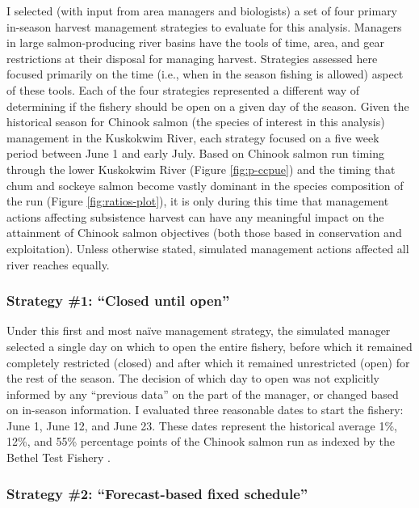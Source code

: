 \documentclass[12pt,]{book}
\theoremstyle{definition}
\theoremstyle{definition}
\theoremstyle{definition}
\theoremstyle{remark}
\begin{document}
\noindent
I selected (with input from area managers and biologists) a set of four
primary in-season harvest management strategies to evaluate for this
analysis. Managers in large salmon-producing river basins have the tools
of time, area, and gear restrictions at their disposal for managing
harvest. Strategies assessed here focused primarily on the time (i.e.,
when in the season fishing is allowed) aspect of these tools. Each of
the four strategies represented a different way of determining if the
fishery should be open on a given day of the season. Given the
historical season for Chinook salmon (the species of interest in this
analysis) management in the Kuskokwim River, each strategy focused on a
five week period between June 1 and early July. Based on Chinook salmon
run timing through the lower Kuskokwim River (Figure \ref{fig:p-ccpue})
and the timing that chum and sockeye salmon become vastly dominant in
the species composition of the run (Figure \ref{fig:ratios-plot}), it is
only during this time that management actions affecting subsistence
harvest can have any meaningful impact on the attainment of Chinook
salmon objectives (both those based in conservation and exploitation).
Unless otherwise stated, simulated management actions affected all river
reaches equally.

\subsubsection{\texorpdfstring{Strategy \#1: ``Closed until
open''}{Strategy \#1: Closed until open}}\label{strategy-1-closed-until-open}

\noindent
Under this first and most naïve management strategy, the simulated
manager selected a single day on which to open the entire fishery,
before which it remained completely restricted (closed) and after which
it remained unrestricted (open) for the rest of the season. The decision
of which day to open was not explicitly informed by any ``previous
data'' on the part of the manager, or changed based on in-season
information. I evaluated three reasonable dates to start the fishery:
June 1, June 12, and June 23. These dates represent the historical
average 1\%, 12\%, and 55\% percentage points of the Chinook salmon run
as indexed by the Bethel Test Fishery \citep{bue-lipka-2016}.

\subsubsection{\texorpdfstring{Strategy \#2: ``Forecast-based fixed
schedule''}{Strategy \#2: Forecast-based fixed schedule}}\label{strategy-2-forecast-based-fixed-schedule}
\end{document}
